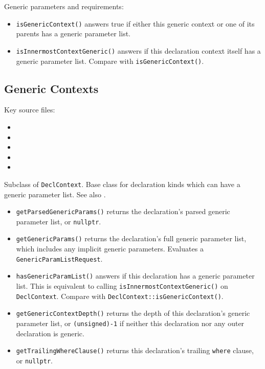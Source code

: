 \documentclass[../generics]{subfiles}
\begin{document}
Generic parameters and requirements:
\begin{itemize}
\item \texttt{isGenericContext()} answers true if either this generic context or one of its parents has a generic parameter list.
\item \texttt{isInnermostContextGeneric()} answers if this declaration context itself has a generic parameter list. Compare with \texttt{isGenericContext()}.
\end{itemize}

\subsection*{Generic Contexts}

Key source files:
\begin{itemize}
\item {}
\item {}
\item {}
\item {}
\item {}
\end{itemize}

Subclass of \texttt{DeclContext}. Base class for declaration kinds which can have a generic parameter list. See also .
\begin{itemize}
\item \texttt{getParsedGenericParams()} returns the declaration's parsed generic parameter list, or \texttt{nullptr}.
\item \texttt{getGenericParams()} returns the declaration's full generic parameter list, which includes any implicit generic parameters. Evaluates a \texttt{GenericParamListRequest}.
\item \texttt{hasGenericParamList()} answers if this declaration has a generic parameter list. This is equivalent to calling \texttt{isInnermostContextGeneric()} on \texttt{DeclContext}. Compare with \texttt{DeclContext::isGenericContext()}.
\item \texttt{getGenericContextDepth()} returns the depth of this declaration's generic parameter list, or \texttt{(unsigned)-1} if neither this declaration nor any outer declaration is generic.
\item \texttt{getTrailingWhereClause()} returns this declaration's trailing \texttt{where} clause, or \texttt{nullptr}.
\end{itemize}
\end{document}
